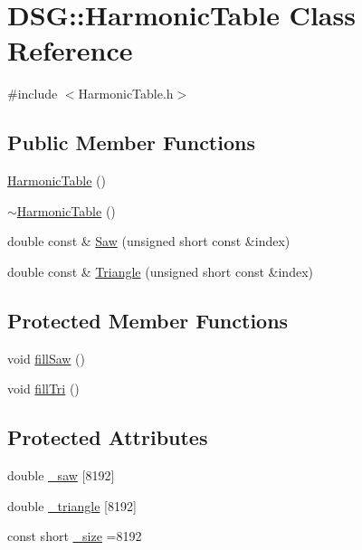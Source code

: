 \hypertarget{classDSG_1_1HarmonicTable}{\section{D\+S\+G\+:\+:Harmonic\+Table Class Reference}
\label{classDSG_1_1HarmonicTable}
}


{\ttfamily \#include $<$Harmonic\+Table.\+h$>$}

\subsection*{Public Member Functions}
\begin{DoxyCompactItemize}
\item 
\hyperlink{classDSG_1_1HarmonicTable_afd434db81626c705285d00de4bd5bc4d}{Harmonic\+Table} ()
\item 
\hyperlink{classDSG_1_1HarmonicTable_a1e8371466c72f447313f79e062852b48}{$\sim$\+Harmonic\+Table} ()
\item 
double const \& \hyperlink{classDSG_1_1HarmonicTable_a979840fc73c8c4b6a7c24eaa3ba6387b}{Saw} (unsigned short const \&index)
\item 
double const \& \hyperlink{classDSG_1_1HarmonicTable_a48331251bdd66ce43485591d8997df72}{Triangle} (unsigned short const \&index)
\end{DoxyCompactItemize}
\subsection*{Protected Member Functions}
\begin{DoxyCompactItemize}
\item 
void \hyperlink{classDSG_1_1HarmonicTable_a72a74b6c4e294c29aad28f7039a9c11a}{fill\+Saw} ()
\item 
void \hyperlink{classDSG_1_1HarmonicTable_ad7bd325b30f752137abf754dbcb563c9}{fill\+Tri} ()
\end{DoxyCompactItemize}
\subsection*{Protected Attributes}
\begin{DoxyCompactItemize}
\item 
double \hyperlink{classDSG_1_1HarmonicTable_a2bbcf6810c1613f8261244fe59233f22}{\+\_\+saw} \mbox{[}8192\mbox{]}
\item 
double \hyperlink{classDSG_1_1HarmonicTable_af364cbeebefb7b3228557cbe406663cc}{\+\_\+triangle} \mbox{[}8192\mbox{]}
\item 
const short \hyperlink{classDSG_1_1HarmonicTable_a7c4a3c7183bfa5f644d4e15679e41706}{\+\_\+size} =8192
\end{DoxyCompactItemize}


